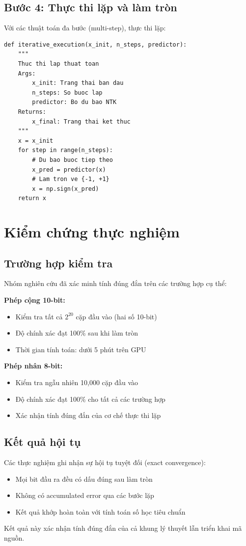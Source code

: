 \subsection{Bước 4: Thực thi lặp và làm tròn}

Với các thuật toán đa bước (multi-step), thực thi lặp:
\begin{lstlisting}
def iterative_execution(x_init, n_steps, predictor):
    """
    Thuc thi lap thuat toan
    Args:
        x_init: Trang thai ban dau
        n_steps: So buoc lap
        predictor: Bo du bao NTK
    Returns:
        x_final: Trang thai ket thuc
    """
    x = x_init
    for step in range(n_steps):
        # Du bao buoc tiep theo
        x_pred = predictor(x)
        # Lam tron ve {-1, +1}
        x = np.sign(x_pred)
    return x
\end{lstlisting}

\section{Kiểm chứng thực nghiệm}

\subsection{Trường hợp kiểm tra}

Nhóm nghiên cứu đã xác minh tính đúng đắn trên các trường hợp cụ thể:

\textbf{Phép cộng 10-bit:}
\begin{itemize}
    \item Kiểm tra tất cả $2^{20}$ cặp đầu vào (hai số 10-bit)
    \item Độ chính xác đạt 100\% sau khi làm tròn
    \item Thời gian tính toán: dưới 5 phút trên GPU
\end{itemize}

\textbf{Phép nhân 8-bit:}
\begin{itemize}
    \item Kiểm tra ngẫu nhiên 10,000 cặp đầu vào
    \item Độ chính xác đạt 100\% cho tất cả các trường hợp
    \item Xác nhận tính đúng đắn của cơ chế thực thi lặp
\end{itemize}

\subsection{Kết quả hội tụ}

Các thực nghiệm ghi nhận sự hội tụ tuyệt đối (exact convergence):
\begin{itemize}
    \item Mọi bit đầu ra đều có dấu đúng sau làm tròn
    \item Không có accumulated error qua các bước lặp
    \item Kết quả khớp hoàn toàn với tính toán số học tiêu chuẩn
\end{itemize}

Kết quả này xác nhận tính đúng đắn của cả khung lý thuyết lẫn triển khai mã nguồn.
